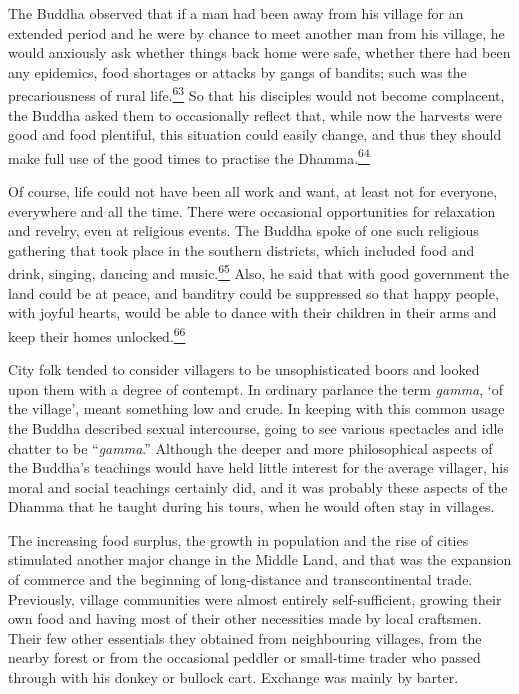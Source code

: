 The Buddha observed that if a man had been away from his village for an
extended period and he were by chance to meet another man from his
village, he would anxiously ask whether things back home were safe,
whether there had been any epidemics, food shortages or attacks by gangs
of bandits; such was the precariousness of rural
life.\label{footprints_split_006.html_fnref63}\hyperref[footprints_split_024.htmlux5cux23fn63]{\textsuperscript{63}}
So that his disciples would not become complacent, the Buddha asked them
to occasionally reflect that, while now the harvests were good and food
plentiful, this situation could easily change, and thus they should make
full use of the good times to practise the
Dhamma.\label{footprints_split_006.html_fnref64}\hyperref[footprints_split_024.htmlux5cux23fn64]{\textsuperscript{64}}

Of course, life could not have been all work and want, at least not for
everyone, everywhere and all the time. There were occasional
opportunities for relaxation and revelry, even at religious events. The
Buddha spoke of one such religious gathering that took place in the
southern districts, which included food and drink, singing, dancing and
music.\label{footprints_split_006.html_fnref65}\hyperref[footprints_split_024.htmlux5cux23fn65]{\textsuperscript{65}}
Also, he said that with good government the land could be at peace, and
banditry could be suppressed so that happy people, with joyful hearts,
would be able to dance with their children in their arms and keep their
homes
unlocked.\label{footprints_split_006.html_fnref66}\hyperref[footprints_split_024.htmlux5cux23fn66]{\textsuperscript{66}}

City folk tended to consider villagers to be unsophisticated boors and
looked upon them with a degree of contempt. In ordinary parlance the
term \emph{gamma}, `of the village', meant something low and crude. In
keeping with this common usage the Buddha described sexual intercourse,
going to see various spectacles and idle chatter to be ``\emph{gamma}.''
Although the deeper and more philosophical aspects of the Buddha's
teachings would have held little interest for the average villager, his
moral and social teachings certainly did, and it was probably these
aspects of the Dhamma that he taught during his tours, when he would
often stay in villages.

The increasing food surplus, the growth in population and the rise of
cities stimulated another major change in the Middle Land, and that was
the expansion of commerce and the beginning of long-distance and
transcontinental trade. Previously, village communities were almost
entirely self-sufficient, growing their own food and having most of
their other necessities made by local craftsmen. Their few other
essentials they obtained from neighbouring villages, from the nearby
forest or from the occasional peddler or small-time trader who passed
through with his donkey or bullock cart. Exchange was mainly by barter.

